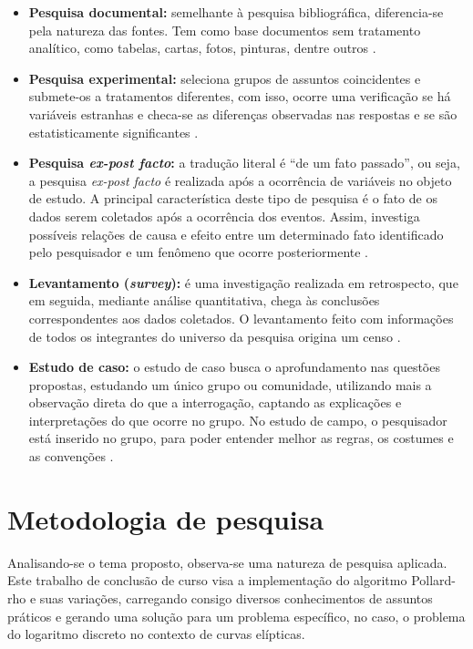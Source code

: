 \begin{itemize}
\begin{itemize}
	\item \textbf{Pesquisa documental:} semelhante à pesquisa bibliográfica, diferencia-se pela natureza das fontes. Tem como base documentos sem tratamento analítico, como tabelas, cartas, fotos, pinturas, dentre outros \cite{Gil:2008}.
	\item \textbf{Pesquisa experimental:} seleciona grupos de assuntos coincidentes e submete-os a tratamentos diferentes, com isso, ocorre uma verificação se há variáveis estranhas e checa-se as diferenças observadas nas respostas e se são estatisticamente significantes \cite{Tafner:2007}.
	\item \textbf{Pesquisa \textit{ex-post facto}:} a tradução literal é ``de um fato passado'', ou seja, a pesquisa \textit{ex-post facto} é realizada após a ocorrência de variáveis no objeto de estudo. A principal característica deste tipo de pesquisa é o fato de os dados serem coletados após a ocorrência dos eventos. Assim, investiga possíveis relações de causa e efeito entre um determinado fato identificado pelo pesquisador e um fenômeno que ocorre posteriormente \cite{Gil:2008}.
	\item \textbf{Levantamento (\textit{survey}):} é uma investigação realizada em retrospecto, que em seguida, mediante análise quantitativa, chega às conclusões correspondentes aos dados coletados. O levantamento feito com informações de todos os integrantes do universo da pesquisa origina um censo \cite{Travassos:2002}.
	\item \textbf{Estudo de caso:} o estudo de caso busca o aprofundamento nas questões propostas, estudando um único grupo ou comunidade, utilizando mais a observação direta do que a interrogação, captando as explicações e interpretações do que ocorre no grupo. No estudo de campo, o pesquisador está inserido no grupo, para poder entender melhor as regras, os costumes e as convenções \cite{Travassos:2002}.
	\end{itemize}
\end{itemize}

%
%
\section{Metodologia de pesquisa}
Analisando-se o tema proposto, observa-se uma natureza de pesquisa aplicada. Este trabalho de conclusão de curso visa a implementação do algoritmo Pollard-rho e suas variações, carregando consigo diversos conhecimentos de assuntos práticos e gerando uma solução para um problema específico, no caso, o problema do logaritmo discreto no contexto de curvas elípticas.


